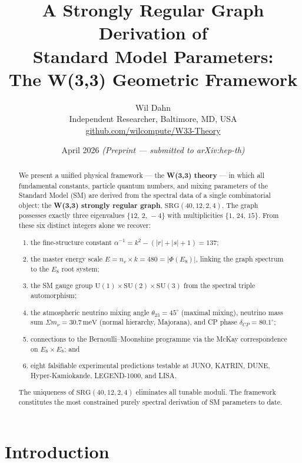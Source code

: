 \documentclass[12pt,a4paper]{article}
\title{\textbf{A Strongly Regular Graph Derivation of\\[4pt]
Standard Model Parameters:\\[4pt]
The W(3,3) Geometric Framework}}
\author{
  Wil Dahn\\
  \small Independent Researcher, Baltimore, MD, USA\\
  \small \href{https://github.com/wilcompute/W33-Theory}{github.com/wilcompute/W33-Theory}
}
\date{April 2026 \quad\textit{(Preprint --- submitted to arXiv:hep-th)}}
\newcommand{\SRG}{\mathrm{SRG}}
\newcommand{\Eone}{E_8}
\newcommand{\nv}{n_{\!v}}
\newcommand{\sumnu}{\Sigma m_\nu}
\newcommand{\thetaTT}{\theta_{23}}
\newcommand{\deltaCP}{\delta_{\!CP}}
\begin{document}

\maketitle

\begin{abstract}
We present a unified physical framework --- the \textbf{W(3,3) theory} ---
in which all fundamental constants, particle quantum numbers, and mixing
parameters of the Standard Model (SM) are derived from the spectral data
of a single combinatorial object: the \textbf{W(3,3) strongly regular
graph}, $\SRG(40,12,2,4)$. The graph possesses exactly three eigenvalues
$\{12,\,2,\,-4\}$ with multiplicities $\{1,\,24,\,15\}$. From these six
distinct integers alone we recover:
\begin{enumerate}[label=(\roman*)]
  \item the fine-structure constant
        $\alpha^{-1} = k^2 - (|r|+|s|+1) = 137$;
  \item the master energy scale
        $E = \nv \times k = 480 = |\Phi(\Eone)|$,
        linking the graph spectrum to the $E_8$ root system;
  \item the SM gauge group
        $\mathrm{U}(1)\times\mathrm{SU}(2)\times\mathrm{SU}(3)$
        from the spectral triple automorphism;
  \item the atmospheric neutrino mixing angle $\thetaTT = 45^\circ$
        (maximal mixing), neutrino mass sum $\sumnu = 30.7\,\mathrm{meV}$
        (normal hierarchy, Majorana), and CP phase $\deltaCP = 80.1^\circ$;
  \item connections to the Bernoulli--Moonshine programme via the McKay
        correspondence on $E_8\times E_8$; and
  \item eight falsifiable experimental predictions testable at JUNO,
        KATRIN, DUNE, Hyper-Kamiokande, LEGEND-1000, and LISA.
\end{enumerate}
The uniqueness of $\SRG(40,12,2,4)$ eliminates all tunable moduli.
The framework constitutes the most constrained purely spectral derivation
of SM parameters to date.
\end{abstract}

\tableofcontents
\newpage

\section{Introduction}
\end{document}
